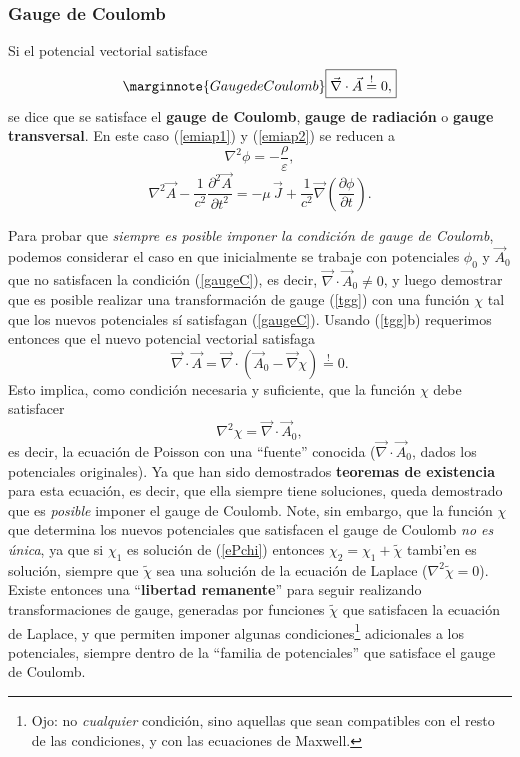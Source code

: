 \subsubsection{Gauge de Coulomb}
Si el potencial vectorial satisface
\begin{equation}\marginnote{Gauge de Coulomb}\label{gaugeC}
\boxed{ \vec{\nabla}\cdot\vec{A}\stackrel{!}{=}0,}
\end{equation}
se dice que se satisface el \textbf{gauge de Coulomb}, \textbf{gauge de radiación} o \textbf{gauge transversal}. En este caso (\ref{emiap1}) y (\ref{emiap2}) se reducen a
\begin{equation}\label{emiap1GC}
 \nabla^2\phi=-\frac{\rho}{\varepsilon},
\end{equation}
\begin{equation}\label{emiap2GC}
 \nabla^2\vec{A}-\frac{1}{c^2}\frac{\partial^2\vec{A}}{\partial t^2}=-\mu\,\vec{J}+\frac{1}{c^2}\vec{\nabla}\left(\frac{\partial\phi }{\partial t}\right).
\end{equation}

Para probar que \textit{siempre es posible imponer la condición de gauge de Coulomb}, podemos considerar el caso en que inicialmente se trabaje con potenciales $\phi_0$ y $\vec{A}_0$ que no satisfacen la condición (\ref{gaugeC}), es decir, $\vec\nabla\cdot\vec{A}_0\neq 0$, y luego demostrar que es posible realizar una transformación de gauge (\ref{tgg}) con una función $\chi$ tal que los nuevos potenciales sí satisfagan (\ref{gaugeC}). Usando (\ref{tgg}b) requerimos entonces que el nuevo potencial vectorial satisfaga
\begin{equation}
\vec\nabla\cdot\vec{A}=\vec\nabla\cdot(\vec{A}_0-\vec\nabla\chi)\stackrel{!}{=}0.
\end{equation}
Esto implica, como condición necesaria y suficiente, que la función $\chi$ debe satisfacer 
\begin{equation}\label{ePchi}
\nabla^2\chi=\vec\nabla\cdot\vec{A}_0,
\end{equation}
es decir, la ecuación de Poisson con una ``fuente'' conocida ($\vec\nabla\cdot\vec{A}_0$, dados los potenciales originales). Ya que han sido demostrados \textbf{teoremas de existencia} para esta ecuación, es decir, que ella siempre tiene soluciones, queda demostrado que es \textit{posible} imponer el gauge de Coulomb. Note, sin embargo, que la función $\chi$ que determina los nuevos potenciales que satisfacen el gauge de Coulomb \textit{no es única}, ya que si $\chi_1$ es solución de (\ref{ePchi}) entonces $\chi_2=\chi_1+\tilde\chi$ tambi'en es solución, siempre que $\tilde\chi$ sea una solución de la ecuación de Laplace ($\nabla^2\tilde\chi=0$). Existe entonces una ``\textbf{libertad remanente}'' para seguir realizando transformaciones de gauge, generadas por funciones $\tilde\chi$ que satisfacen la ecuación de Laplace, y que permiten imponer algunas condiciones\footnote{Ojo: no \textit{cualquier} condición, sino aquellas que sean compatibles con el resto de las condiciones, y con las ecuaciones de Maxwell.} adicionales a los potenciales, siempre dentro de la ``familia de potenciales'' que satisface el gauge de Coulomb.

